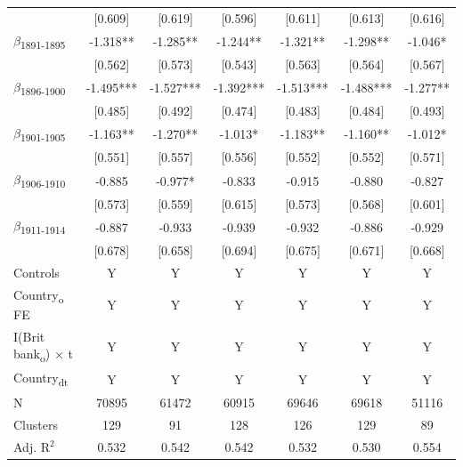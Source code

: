 {\begin{tabular}{l*{6}{c}}
            &     [0.609]   &     [0.619]   &     [0.596]   &     [0.611]   &     [0.613]   &     [0.616]   \\
$\beta$\textsubscript{1891-1895}&      -1.318** &      -1.285** &      -1.244** &      -1.321** &      -1.298** &      -1.046*  \\
            &     [0.562]   &     [0.573]   &     [0.543]   &     [0.563]   &     [0.564]   &     [0.567]   \\
$\beta$\textsubscript{1896-1900}&      -1.495***&      -1.527***&      -1.392***&      -1.513***&      -1.488***&      -1.277** \\
            &     [0.485]   &     [0.492]   &     [0.474]   &     [0.483]   &     [0.484]   &     [0.493]   \\
$\beta$\textsubscript{1901-1905}&      -1.163** &      -1.270** &      -1.013*  &      -1.183** &      -1.160** &      -1.012*  \\
            &     [0.551]   &     [0.557]   &     [0.556]   &     [0.552]   &     [0.552]   &     [0.571]   \\
$\beta$\textsubscript{1906-1910}&      -0.885   &      -0.977*  &      -0.833   &      -0.915   &      -0.880   &      -0.827   \\
            &     [0.573]   &     [0.559]   &     [0.615]   &     [0.573]   &     [0.568]   &     [0.601]   \\
$\beta$\textsubscript{1911-1914}&      -0.887   &      -0.933   &      -0.939   &      -0.932   &      -0.886   &      -0.929   \\
            &     [0.678]   &     [0.658]   &     [0.694]   &     [0.675]   &     [0.671]   &     [0.668]   \\
Controls    &           Y   &           Y   &           Y   &           Y   &           Y   &           Y   \\
Country\textsubscript{o} FE&           Y   &           Y   &           Y   &           Y   &           Y   &           Y   \\
I(Brit bank\textsubscript{o}) $\times$ t&           Y   &           Y   &           Y   &           Y   &           Y   &           Y   \\
Country\textsubscript{dt}&           Y   &           Y   &           Y   &           Y   &           Y   &           Y   \\
\midrule
N           &       70895   &       61472   &       60915   &       69646   &       69618   &       51116   \\
Clusters    &         129   &          91   &         128   &         126   &         129   &          89   \\
Adj. R{$^2$}&       0.532   &       0.542   &       0.542   &       0.532   &       0.530   &       0.554   \\
\bottomrule
\end{tabular}
}
